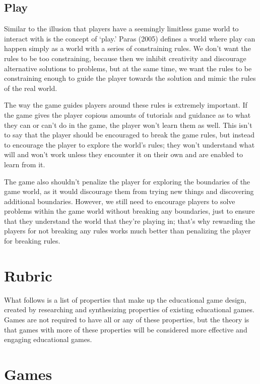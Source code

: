 \documentclass[12pt]{report}
\begin{document}
	\section{Play}

		Similar to the illusion that players have a seemingly limitless game world to interact with is the concept of ‘play.' Paras (2005) defines a world where play can happen simply as a world with a series of constraining rules. We don't want the rules to be too constraining, because then we inhibit creativity and discourage alternative solutions to problems, but at the same time, we want the rules to be constraining enough to guide the player towards the solution and mimic the rules of the real world.
		
		The way the game guides players around these rules is extremely important. If the game gives the player copious amounts of tutorials and guidance as to what they can or can't do in the game, the player won't learn them as well. This isn't to say that the player should be encouraged to break the game rules, but instead to encourage the player to explore the world's rules; they won't understand what will and won't work unless they encounter it on their own and are enabled to learn from it.
	
		The game also shouldn't penalize the player for exploring the boundaries of the game world, as it would discourage them from trying new things and discovering additional boundaries. However, we still need to encourage players to solve problems within the game world without breaking any boundaries, just to ensure that they understand the world that they're playing in; that's why rewarding the players for not breaking any rules works much better than penalizing the player for breaking rules.

\chapter{Rubric}
	What follows is a list of properties that make up the educational game design, created by researching and synthesizing properties of existing educational games. Games are not required to have all or any of these properties, but the theory is that games with more of these properties will be considered more effective and engaging educational games.



\chapter{Games}
\end{document}
